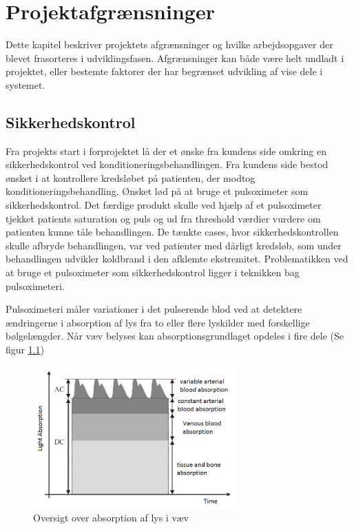 \chapter{Projektafgrænsninger}
Dette kapitel beskriver projektets afgrænsninger og hvilke arbejdsopgaver der blevet frasorteres i udviklingsfasen. Afgrænsninger kan både være helt undladt i projektet, eller bestemte faktorer der har begrænset udvikling af vise dele i systemet. 

\section{Sikkerhedskontrol} \label{title:sikkerhedskontrol}
Fra projekts start i forprojektet lå der et ønske fra kundens side omkring en sikkerhedskontrol ved konditioneringsbehandlingen. Fra kundens side bestod ønsket i at kontrollere kredsløbet på patienten, der modtog konditioneringsbehandling. Ønsket lød på at bruge et pulsoximeter som sikkerhedskontrol. Det færdige produkt skulle ved hjælp af et pulsoximeter tjekket patients saturation og puls og ud fra threshold værdier vurdere om patienten kunne tåle behandlingen. De tænkte cases, hvor sikkerhedskontrollen skulle afbryde behandlingen, var ved patienter med dårligt kredsløb, som under behandlingen udvikler koldbrand i den afklemte ekstremitet. Problematikken ved at bruge et pulsoximeter som sikkerhedskontrol ligger i teknikken bag pulsoximeteri. 

Pulsoximeteri måler variationer i det pulserende blod ved at detektere ændringerne i absorption af lys fra to eller flere lyskilder med forskellige bølgelængder. Når væv belyses kan absorptionsgrundlaget opdeles i fire dele (Se figur \ref{fig:opticTissue})
\begin{figure}[H]
	\centering
	\includegraphics[width = 0.7\textwidth]{billeder/opticTissue.png}
	\caption{Oversigt over absorption af lys i væv}\label{fig:opticTissue}
\end{figure}


